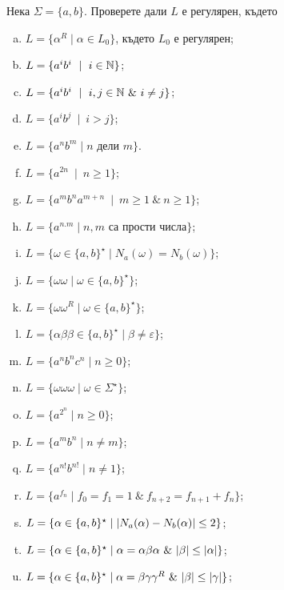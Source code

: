 \begin{problem}
  Нека $\Sigma = \{a,b\}$.  Проверете дали $L$ е регулярен, където
  \begin{enumerate}[a)]
  \item
    $L = \{\alpha^R \mid \alpha \in L_0\}$, където $L_0$ е регулярен;
  \item
    $L = \{a^ib^i\ \mid\ i\in\Nat\}$;
  \item
    $L = \{a^ib^i\ \mid\ i,j\in\Nat\ \&\ i\neq j\}$;
  \item
    $L = \{a^ib^j\ \mid\ i > j\}$;
  \item
    $L = \{a^nb^m \mid n\mbox{ дели }m\}$.
  \item
    $L = \{a^{2n}\ \mid\ n\geq 1\}$;
  \item
    $L = \{a^mb^na^{m+n}\ \mid\ m\geq 1\ \&\ n\geq 1\}$;
  \item
    $L = \{a^{n.m}\mid n,m\mbox{ са прости числа}\}$;
  \item
    $L = \{\omega\in\{a,b\}^\star \mid N_a(\omega) = N_b(\omega)\}$;
  \item
    $L = \{\omega\omega\mid \omega\in\{a,b\}^\star\}$;
  \item
    $L = \{\omega\omega^R\mid \omega\in\{a,b\}^\star\}$;
  \item
    $L = \{\alpha\beta\beta \in \{a,b\}^\star\mid \beta \neq \varepsilon\}$;
  \item
    $L = \{a^nb^nc^n\mid n\geq 0\}$;
  \item
    $L = \{\omega\omega\omega\mid \omega\in \Sigma^\star\}$;
  \item
    $L = \{a^{2^n}\mid n\geq 0\}$;
  \item
    $L = \{a^mb^n\mid n\neq m\}$;
  \item
    $L = \{a^{n!}b^{n!}\mid n\neq 1\}$;
  \item
    $L = \{a^{f_n} \mid f_0 = f_1 = 1\ \&\ f_{n+2} = f_{n+1} + f_{n}\}$;
  \item
    $L = \{\alpha \in \{a,b\}^\star \mid \lvert{N_a(\alpha) - N_b(\alpha)}\rvert \leq 2\}$;
  \item
    $L = \{\alpha \in \{a,b\}^\star \mid \alpha = \alpha\beta\alpha\ \&\ \lvert{\beta}\rvert \leq \lvert{\alpha}\rvert\}$;
  \item
    $L = \{\alpha \in \{a,b\}^\star \mid \alpha = \beta\gamma\gamma^R\ \&\ \lvert{\beta}\rvert \leq \lvert{\gamma}\rvert\}$;

\end{enumerate}
\end{problem}
